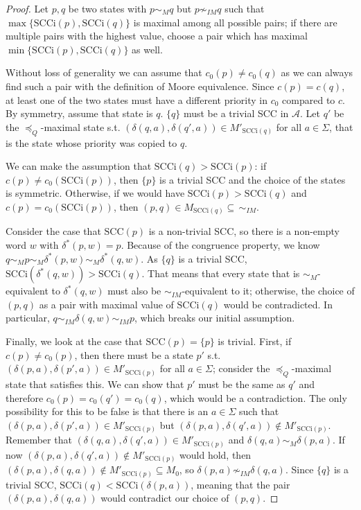 \begin{proof}
	Let $p, q$ be two states with $p \sim_M q$ but $p \not\sim_{IM} q$ such that $\max \{\text{SCCi}(p), \text{SCCi}(q)\}$ is maximal among all possible pairs; if there are multiple pairs with the highest value, choose a pair which has maximal $\min \{\text{SCCi}(p), \text{SCCi}(q)\}$ as well.
	
	Without loss of generality we can assume that $c_0(p) \neq c_0(q)$ as we can always find such a pair with the definition of Moore equivalence. Since $c(p) = c(q)$, at least one of the two states must have a different priority in $c_0$ compared to $c$. By symmetry, assume that state is $q$. $\{q\}$ must be a trivial SCC in $\mathcal{A}$. Let $q'$ be the $\preceq_Q$-maximal state s.t. $(\delta(q, a), \delta(q', a)) \in M'_{\text{SCCi}(q)}$ for all $a \in \Sigma$, that is the state whose priority was copied to $q$.
	
	We can make the assumption that $\text{SCCi}(q) > \text{SCCi}(p)$: if $c(p) \neq c_0(\text{SCCi}(p))$, then $\{p\}$ is a trivial SCC and the choice of the states is symmetric. Otherwise, if we would have $\text{SCCi}(p) > \text{SCCi}(q)$ and $c(p) = c_0(\text{SCCi}(p))$, then $(p, q) \in M_{\text{SCCi}(q)} \subseteq\, \sim_{IM}$. 
	
	Consider the case that $\text{SCC}(p)$ is a non-trivial SCC, so there is a non-empty word $w$ with $\delta^*(p, w) = p$. Because of the congruence property, we know $q \sim_M p \sim_M \delta^*(p, w) \sim_M \delta^*(q, w)$. As $\{q\}$ is a trivial SCC, $\text{SCCi}(\delta^*(q, w)) > \text{SCCi}(q)$. That means that every state that is $\sim_M$-equivalent to $\delta^*(q, w)$ must also be $\sim_{IM}$-equivalent to it; otherwise, the choice of $(p, q)$ as a pair with maximal value of $\text{SCCi}(q)$ would be contradicted. In particular, $q \sim_{IM} \delta(q, w) \sim_{IM} p$, which breaks our initial assumption.
	\vspace{5pt}
	
	Finally, we look at the case that $\text{SCC}(p) = \{p\}$ is trivial. First, if $c(p) \neq c_0(p)$, then there must be a state $p'$ s.t. $(\delta(p, a), \delta(p', a)) \in M'_{\text{SCCi}(p)}$ for all $a \in \Sigma$; consider the $\preceq_Q$-maximal state that satisfies this. We can show that $p'$ must be the same as $q'$ and therefore $c_0(p) = c_0(q') = c_0(q)$, which would be a contradiction. The only possibility for this to be false is that there is an $a \in \Sigma$ such that $(\delta(p, a), \delta(p', a)) \in M'_{\text{SCCi}(p)}$ but $(\delta(p, a), \delta(q', a)) \notin M'_{\text{SCCi}(p)}$. Remember that $(\delta(q, a), \delta(q', a)) \in M'_{\text{SCCi}(p)}$ and $\delta(q, a) \sim_M \delta(p, a)$. If now $(\delta(p, a), \delta(q', a)) \notin M'_{\text{SCCi}(p)}$ would hold, then $(\delta(p, a), \delta(q, a)) \notin M'_{\text{SCCi}(p)} \subseteq M_0$, so $\delta(p, a) \not\sim_{IM} \delta(q, a)$. Since $\{q\}$ is a trivial SCC, $\text{SCCi}(q) < \text{SCCi}(\delta(p, a))$, meaning that the pair $(\delta(p, a), \delta(q, a))$ would contradict our choice of $(p, q)$.
	

\end{proof}
